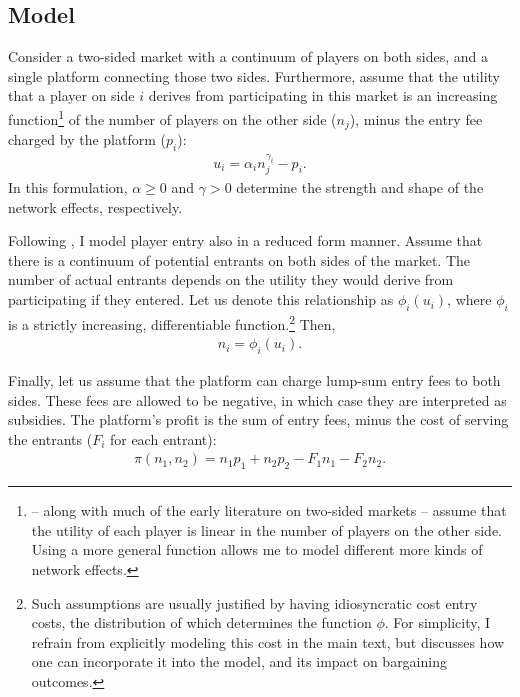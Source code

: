 \documentclass[a4paper]{article}
\begin{document}
\subsection{Model}

Consider a two-sided market with a continuum of players on both sides, and a single platform connecting those two sides.
Furthermore, assume that the utility that a player on side $i$ derives from participating in this market is an increasing function\footnote{
    \textcite{armstrong2006competition} -- along with much of the early literature on two-sided markets \parencite[e.g.][]{rochet2003platform,hagiu2006pricing} -- assume that the utility of each player is linear in the number of players on the other side.
    Using a more general function allows me to model different more kinds of network effects.
} of the number of players on the other side ($n_j$), minus the entry fee charged by the platform ($p_i$):
\begin{align*}
    u_i = \alpha_i n_j ^ {\gamma_i} - p_i.
\end{align*}
In this formulation, $\alpha \geq 0$ and $\gamma > 0$ determine the strength and shape of the network effects, respectively.

Following \textcite{armstrong2006competition}, I model player entry also in a reduced form manner.
Assume that there is a continuum of potential entrants on both sides of the market.
The number of actual entrants depends on the utility they would derive from participating if they entered.
Let us denote this relationship as $\phi_i(u_i)$, where $\phi_i$ is a strictly increasing, differentiable function.\footnote{
    Such assumptions are usually justified by having idiosyncratic cost entry costs, the distribution of which determines the function $\phi$.
    For simplicity, I refrain from explicitly modeling this cost in the main text, but  discusses how one can incorporate it into the model, and its impact on bargaining outcomes.
}
Then,
\begin{align*}
    n_i = \phi_i(u_i).
\end{align*}

Finally, let us assume that the platform can charge lump-sum entry fees to both sides.
These fees are allowed to be negative, in which case they are interpreted as subsidies.
The platform's profit is the sum of entry fees, minus the cost of serving the entrants ($F_i$ for each entrant):
\begin{align*}
    \pi(n_1, n_2) = n_1 p_1 + n_2 p_2 - F_1 n_1 - F_2 n_2.
\end{align*}
\end{document}
